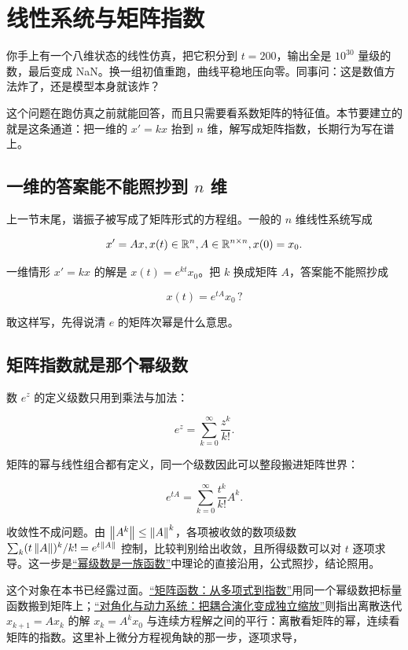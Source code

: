 \section{线性系统与矩阵指数}
\label{sec:15-Differential-Equations-and-Dynamical-Systems/01-ODE-Theory/02}

你手上有一个八维状态的线性仿真，把它积分到 \(t=200\)，输出全是 \(10^{30}\) 量级的数，最后变成 NaN。换一组初值重跑，曲线平稳地压向零。同事问：这是数值方法炸了，还是模型本身就该炸？

这个问题在跑仿真之前就能回答，而且只需要看系数矩阵的特征值。本节要建立的就是这条通道：把一维的 \(x'=kx\) 抬到 \(n\) 维，解写成矩阵指数，长期行为写在谱上。

\subsection{一维的答案能不能照抄到 \(n\) 维}

上一节末尾，谐振子被写成了矩阵形式的方程组。一般的 \(n\) 维线性系统写成

\[
x'=Ax,
\space
x(t)\in\mathbb{R}^n,\space A\in\mathbb{R}^{n\times n},
\space
x(0)=x_0.
\]

一维情形 \(x'=kx\) 的解是 \(x(t)=e^{kt}x_0\)。把 \(k\) 换成矩阵 \(A\)，答案能不能照抄成

\[
x(t)=e^{tA}x_0\,?
\]

敢这样写，先得说清 \(e\) 的矩阵次幂是什么意思。

\subsection{矩阵指数就是那个幂级数}

数 \(e^z\) 的定义级数只用到乘法与加法：

\[
e^{z}=\sum_{k=0}^{\infty}\frac{z^k}{k!}.
\]

矩阵的幂与线性组合都有定义，同一个级数因此可以整段搬进矩阵世界：

\[
e^{tA}=\sum_{k=0}^{\infty}\frac{t^k}{k!}A^k.
\]

收敛性不成问题。由 \(\left\lVert A^k\right\rVert\le\left\lVert A\right\rVert^k\)，各项被收敛的数项级数 \(\sum_k(t\left\lVert A\right\rVert)^k/k!=e^{t\left\lVert A\right\rVert}\) 控制，比较判别给出收敛，且所得级数可以对 \(t\) 逐项求导。这一步是\hyperref[sec:02-Calculus/05-Sequences-and-Series/05]{``幂级数是一族函数''}中理论的直接沿用，公式照抄，结论照用。

这个对象在本书已经露过面。\hyperref[sec:03-Linear-Algebra/05-Eigenvalues-and-Eigenvectors/04]{``矩阵函数：从多项式到指数''}用同一个幂级数把标量函数搬到矩阵上；\hyperref[sec:03-Linear-Algebra/05-Eigenvalues-and-Eigenvectors/02]{``对角化与动力系统：把耦合演化变成独立缩放''}则指出离散迭代 \(x_{k+1}=Ax_k\) 的解 \(x_k=A^kx_0\) 与连续方程解之间的平行：离散看矩阵的幂，连续看矩阵的指数。这里补上微分方程视角缺的那一步，逐项求导，

